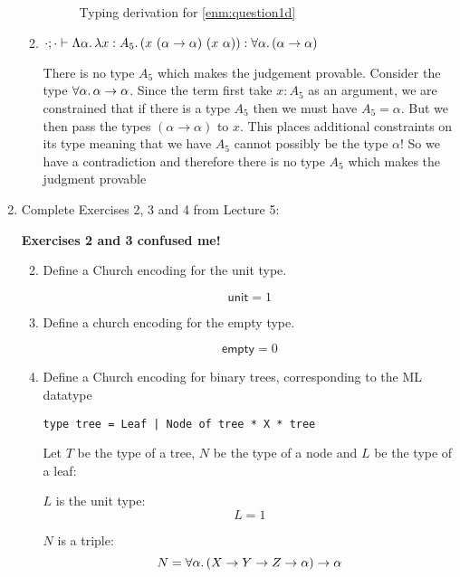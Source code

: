 \documentclass[10pt,\jkfside,a4paper]{article}
\begin{document}
\begin{enumerate}
\begin{enumerate}
\begin{figure}[H]
            \caption{Typing derivation for \ref{enm:question1d}}

        \end{figure}

        \item $\cdot; \cdot \vdash \Lambda \alpha\ldotp \lambda x: A_5\ldotp (x\ (\alpha \to \alpha)\ (x\ \alpha)): \forall \alpha\ldotp (\alpha \to \alpha)$

        There is no type $A_5$ which makes the judgement provable. Consider the type $\forall \alpha\ldotp \alpha \to \alpha$. Since the term first take $x: A_5$ as an argument, we are constrained that
        if there is a type $A_5$ then we must have $A_5 = \alpha$. But we then pass the types $(\alpha \to \alpha)$ to $x$. This places additional constraints on its type meaning that we have $A_5$ cannot
        possibly be the type $\alpha$! So we have a contradiction and therefore there is no type $A_5$ which makes the judgment provable

    \end{enumerate}

    \item Complete Exercises 2, 3 and 4 from Lecture 5:

    \textbf{Exercises 2 and 3 confused me!}

    \begin{enumerate}[label=(\arabic*)]

        \setcounter{enumii}{1}

        \item Define a Church encoding for the unit type.

        \[
            \mathsf{unit} = 1
        \]

        \item Define a church encoding for the empty type.

        \[
            \mathsf{empty} = 0
        \]

        \item Define a Church encoding for binary trees, corresponding to the ML datatype

        \texttt{type tree = Leaf | Node of tree * X * tree}

        Let $T$ be the type of a tree, $N$ be the type of a node and $L$ be the type of a leaf:

        $L$ is the unit type:
        \[
            L = 1
        \]

        $N$ is a triple:
        \[
            N = \forall \alpha\ldotp (X \to Y \to Z \to \alpha) \to \alpha
        \]


\end{enumerate}
\end{enumerate}
\end{document}
